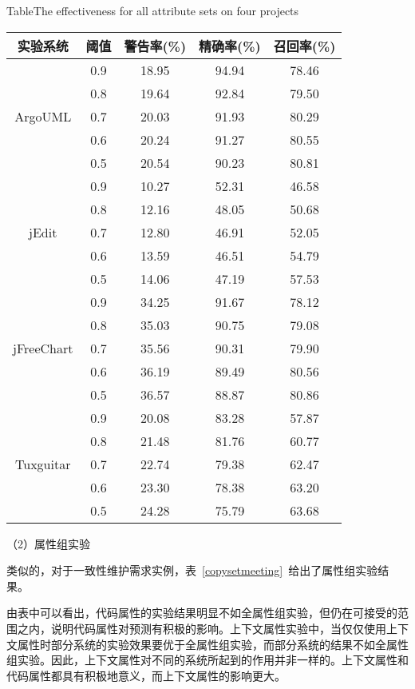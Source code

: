\begin{table}[htbp]
{Table$\!$}{The effectiveness for all attribute sets on four projects}
\vspace{0.5em}
\centering
\wuhao
\begin{tabular}{ccccc}
\toprule[1.5pt]
{实验系统}&{阈值}&{警告率(\%)}&{精确率(\%)}&{召回率(\%)}\\
\midrule[1pt]
\multirow{5}{*}{ArgoUML}
&0.9&	18.95&	94.94&	78.46\\
&0.8&	19.64&	92.84&	79.50\\
&0.7&	20.03&	91.93&	80.29\\
&0.6&	20.24&	91.27&	80.55\\
&0.5&	20.54&	90.23&	80.81\\
\hline
\multirow{5}{*}{jEdit}
&0.9&	10.27&	52.31&	46.58\\
&0.8&	12.16&	48.05&	50.68\\
&0.7&	12.80&	46.91&	52.05\\
&0.6&	13.59&	46.51&	54.79\\
&0.5&	14.06&	47.19&	57.53\\
\hline
\multirow{5}{*}{jFreeChart}
&0.9&	34.25&	91.67&	78.12\\
&0.8&	35.03&	90.75&	79.08\\
&0.7&	35.56&	90.31&	79.90\\
&0.6&	36.19&	89.49&	80.56\\
&0.5&	36.57&	88.87&	80.86\\
\hline
\multirow{5}{*}{Tuxguitar}
&0.9&	20.08&	83.28&	57.87\\
&0.8&	21.48&	81.76&	60.77\\
&0.7&	22.74&	79.38&	62.47\\
&0.6&	23.30&	78.38&	63.20\\
&0.5&	24.28&	75.79&	63.68\\
\bottomrule[1.5pt]
\end{tabular}
\end{table}

（2）属性组实验

类似的，对于一致性维护需求实例，表~\ref{copysetmeeting}~给出了属性组实验结果。

由表中可以看出，代码属性的实验结果明显不如全属性组实验，但仍在可接受的范围之内，说明代码属性对预测有积极的影响。上下文属性实验中，当仅仅使用上下文属性时部分系统的实验效果要优于全属性组实验，而部分系统的结果不如全属性组实验。因此，上下文属性对不同的系统所起到的作用并非一样的。上下文属性和代码属性都具有积极地意义，而上下文属性的影响更大。

